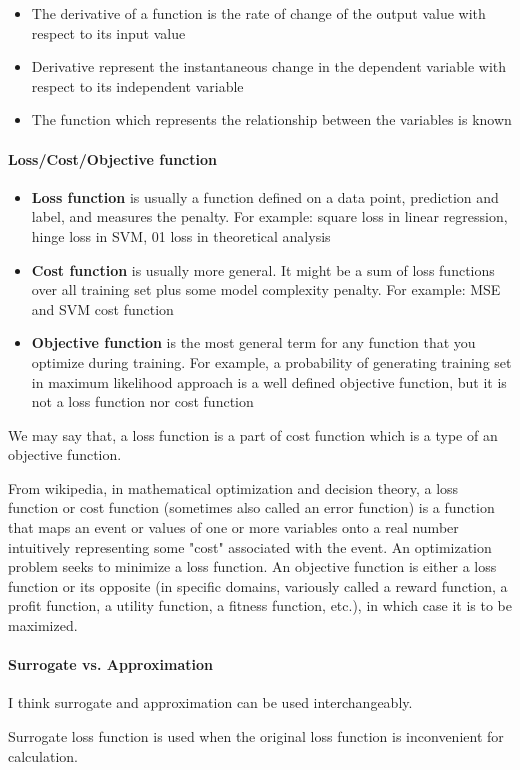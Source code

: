 \documentclass[lang=en,mode=geye,device=normal,color=blue,14pt]{elegantnote}
\DeclareMathOperator*{\1}{\mathbbm{1}}
\begin{document}
\begin{itemize}
\item The derivative of a function is the rate of change of the output value with respect to its input value
\item Derivative represent the instantaneous change in the dependent variable with respect to its independent variable
\item The function which represents the relationship between the variables is known
\end{itemize}


\paragraph{Loss/Cost/Objective function}

\begin{itemize}
\item \textbf{Loss function} is usually a function defined on a data point, prediction and label, and measures the penalty. For example: square loss in linear regression, hinge loss in SVM, 01 loss in theoretical analysis
\item \textbf{Cost function} is usually more general. It might be a sum of loss functions over all training set plus some model complexity penalty. For example: MSE and SVM cost function
\item \textbf{Objective function} is the most general term for any function that you optimize during training. For example, a probability of generating training set in maximum likelihood approach is a well defined objective function, but it is not a loss function nor cost function
\end{itemize}

We may say that, a loss function is a part of cost function which is a type of an objective function.

From wikipedia, in mathematical optimization and decision theory, a loss function or cost function (sometimes also called an error function) is a function that maps an event or values of one or more variables onto a real number intuitively representing some "cost" associated with the event. An optimization problem seeks to minimize a loss function. An objective function is either a loss function or its opposite (in specific domains, variously called a reward function, a profit function, a utility function, a fitness function, etc.), in which case it is to be maximized.

\paragraph{Surrogate vs. Approximation}

I think surrogate and approximation can be used interchangeably.

Surrogate loss function is used when the original loss function is inconvenient for calculation.


\end{document}

